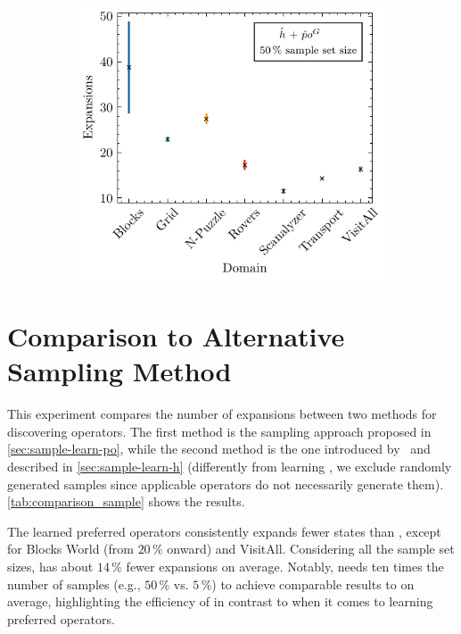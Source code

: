 \documentclass[ppgc,diss,english]{iiufrgs}
\begin{document}
\begin{figure}[tb]
  \vspace{0.5cm}

  \begin{subfigure}{0.41\textwidth}
    \centering
    \includegraphics[width=\linewidth]{img/error_hNN_poG_50pct.pdf}
  \end{subfigure}
  \label{fig:errors}
\end{figure}


\section{Comparison to Alternative Sampling Method}
\label{sec:exp-comparison-sample-method}
This experiment compares the number of expansions between two methods for discovering operators. The first method is the sampling approach proposed in \cref{sec:sample-learn-po}, while the second method is the one introduced by~\citet{Bettker.etal/2022} and described in \cref{sec:sample-learn-h} (differently from learning \hnn, we exclude randomly generated samples since applicable operators do not necessarily generate them). \cref{tab:comparison_sample} shows the results.

The learned preferred operators \pog consistently expands fewer states than \pofsm, except for Blocks World (from $20\,\%$ onward) and VisitAll. Considering all the sample set sizes, \pog has about $14\,\%$ fewer expansions on average. Notably, \pofsm needs ten times the number of samples (e.g., $50\,\%$ vs. $5\,\%$) to achieve comparable results to \pog on average, highlighting the efficiency of \bfsrs in contrast to \bfsrw when it comes to learning preferred operators.
\end{document}
